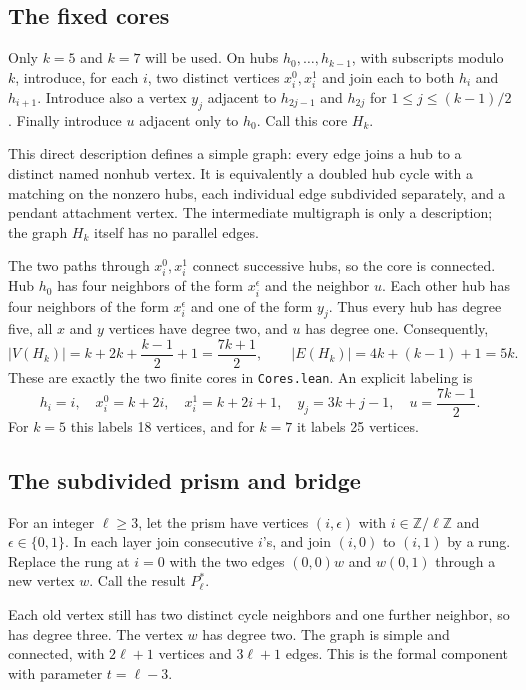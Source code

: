 \documentclass[11pt]{amsart}
\theoremstyle{definition}
\theoremstyle{remark}
\newcommand{\Z}{\mathbb Z}
\begin{document}
\subsection{The fixed cores}
Only $k=5$ and $k=7$ will be used. On hubs $h_0,\ldots,h_{k-1}$, with subscripts modulo $k$, introduce, for each $i$, two distinct vertices $x_i^0,x_i^1$ and join each to both $h_i$ and $h_{i+1}$. Introduce also a vertex $y_j$ adjacent to $h_{2j-1}$ and $h_{2j}$ for $1\le j\le(k-1)/2$. Finally introduce $u$ adjacent only to $h_0$. Call this core $H_k$.

This direct description defines a simple graph: every edge joins a hub to a distinct named nonhub vertex. It is equivalently a doubled hub cycle with a matching on the nonzero hubs, each individual edge subdivided separately, and a pendant attachment vertex. The intermediate multigraph is only a description; the graph $H_k$ itself has no parallel edges.

The two paths through $x_i^0,x_i^1$ connect successive hubs, so the core is connected. Hub $h_0$ has four neighbors of the form $x_i^\epsilon$ and the neighbor $u$. Each other hub has four neighbors of the form $x_i^\epsilon$ and one of the form $y_j$. Thus every hub has degree five, all $x$ and $y$ vertices have degree two, and $u$ has degree one. Consequently,
\begin{equation}\label{eq:core}
 |V(H_k)|=k+2k+\frac{k-1}{2}+1=\frac{7k+1}{2},
 \qquad |E(H_k)|=4k+(k-1)+1=5k.
\end{equation}
These are exactly the two finite cores in \texttt{Cores.lean}. An explicit labeling is
\[
 h_i=i,\quad x_i^0=k+2i,\quad x_i^1=k+2i+1,
 \quad y_j=3k+j-1,\quad u=\frac{7k-1}{2}.
\]
For $k=5$ this labels 18 vertices, and for $k=7$ it labels 25 vertices.

\subsection{The subdivided prism and bridge}
For an integer $\ell\ge3$, let the prism have vertices $(i,\epsilon)$ with $i\in\Z/\ell\Z$ and $\epsilon\in\{0,1\}$. In each layer join consecutive $i$'s, and join $(i,0)$ to $(i,1)$ by a rung. Replace the rung at $i=0$ with the two edges $(0,0)w$ and $w(0,1)$ through a new vertex $w$. Call the result $P_\ell^*$.

Each old vertex still has two distinct cycle neighbors and one further neighbor, so has degree three. The vertex $w$ has degree two. The graph is simple and connected, with $2\ell+1$ vertices and $3\ell+1$ edges. This is the formal component with parameter $t=\ell-3$.
\end{document}
